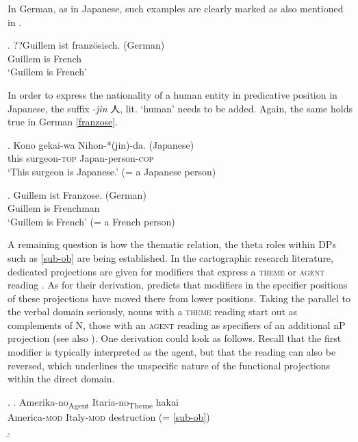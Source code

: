 \documentclass [output=book,colorlinks,citecolor=brown]{langscibook}
\begin{document}
In German, as in Japanese, such examples are clearly marked as also mentioned in \citet{kotowski:2016:adj}. %


\exg. ??Guillem ist französisch. (German)\\
Guillem is French\\
`Guillem is French’

In order to express the nationality of a human entity in predicative position in Japanese, the suffix -\textit{jin} 人, lit. `human' needs to be added. Again, the same holds true in German \ref{franzose}.

\exg. Kono gekai-wa Nihon-*(jin)-da. (Japanese)\\
this surgeon-\textsc{top} Japan-person-\textsc{cop}\\
`This surgeon is Japanese.’ (= a Japanese person)

\exg. Guillem ist Franzose. (German)\\
Guillem is Frenchman\\
`Guillem is French’ (= a French person) \label{franzose}

A remaining question is how the thematic relation, the theta roles within DPs such as \ref{sub-ob} are being established. In the cartographic research literature, dedicated projections are given for modifiers that express a \textsc{theme} or \textsc{agent} reading \citep{cinque:1993:evidence, laenzlinger:2005:french, laenzlinger:2011:elements, bortolotto:2016:RA}. As for their derivation, \citet{laenzlinger:2011:elements} predicts that modifiers in the specifier positions of these projections have moved there from lower positions. Taking the parallel to the verbal domain seriously, nouns with a \textsc{theme} reading start out as complements of N, those with an \textsc{agent} reading as specifiers of an additional nP projection (see also \citealt{adger:2003:core}). One derivation could look as follows. Recall that the first modifier is typically interpreted as the agent, but that the reading can also be reversed, which underlines the unspecific nature of the functional projections within the direct domain. %


\ex. \ag. Amerika-no\textsubscript{Agent} Itaria-no\textsubscript{Theme} hakai\\
America-\textsc{mod} Italy-\textsc{mod} destruction \null \hfill (= \ref{sub-ob})\\
\b. 
\end{document}
